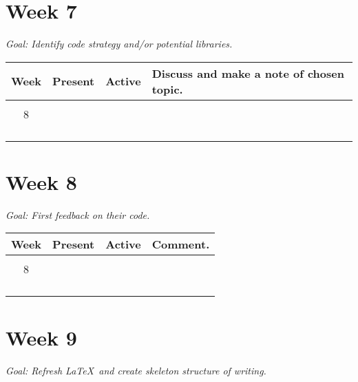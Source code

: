\documentclass[12pt]{article}
\begin{document}
\section*{Week 7}
\centering\small{\textit{Goal: Identify code strategy and/or potential libraries.}}

\begin{center}
	\begin{tabular}{c|l|l|p{}}
		\toprule
		Week        & Present & Active & Discuss and make a note of chosen topic.\\
		\midrule
		            &         &        & \\
		8           &         &        & \\
		            &         &        & \\
		            &         &        & \\
		            &         &        & \\
		            &         &        & \\
	\end{tabular}
\end{center}

\newpage

\section*{Week 8}
\centering\small{\textit{Goal: First feedback on their code.}}

\begin{center}
	\begin{tabular}{c|l|l|p{}}
		\toprule
		Week        & Present & Active & Comment.\\
		\midrule
		            &         &        & \\
		8           &         &        & \\
		            &         &        & \\
		            &         &        & \\
		            &         &        & \\
		            &         &        & \\
	\end{tabular}
\end{center}

\section*{Week 9}
\centering\small{\textit{Goal: Refresh \LaTeX\ and create skeleton structure of writing.}}
\end{document}
